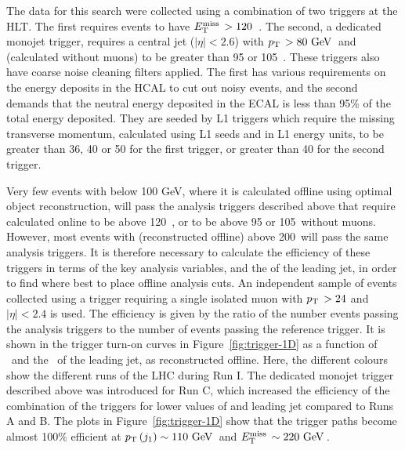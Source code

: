 The data for this search were collected using a combination of two triggers at the \ac{HLT}. 
The first requires events to have $E_{\text{T}}^{\text{miss}}\,>120$~\GeV.
The second, a dedicated monojet trigger, requires a central jet ($|\eta|<2.6$) with $p_{\text{T}}\,>80~\mathrm{GeV}\,$ and \MET 
(calculated without muons) to be greater than 95 or 105~\GeV. 
These triggers also have coarse noise cleaning filters applied. 
The first has various requirements on the energy deposits in the \ac{HCAL} to cut out noisy events, 
and the second demands that the neutral energy deposited in the \ac{ECAL} is less than 95\% of the total energy deposited.
They are seeded by \ac{L1} triggers which require the missing transverse momentum, calculated using \ac{L1} seeds and in \ac{L1} energy units, to be greater than 36, 40 or 50 for the first trigger, or greater than 40 for the second trigger. 


Very few events with \MET below 100 GeV, where it is calculated offline using optimal object reconstruction,  will pass the analysis triggers described above that require \MET calculated online to be above 120~\GeV, or to be above 95 or 105~\GeV without muons. 
However, most events with \MET (reconstructed offline) above 200~\GeV will pass the same analysis triggers. 
It is therefore necessary to calculate the efficiency of these triggers in terms of the key analysis variables, \MET and the \pt of the leading jet, in order to find where best to place offline analysis cuts. 
An independent sample of events collected using a trigger requiring a single isolated muon with $p_{\text{T}}\, > 24$ and $|\eta|<2.4$ is used.
The efficiency is given by the ratio of the number events passing the analysis triggers to the number of events passing the reference trigger. 
It is shown in the trigger turn-on curves in Figure~\ref{fig:trigger-1D} as a function of \MET\ and the \pt\ of the leading jet, as reconstructed offline. 
Here, the different colours show the different runs of the \ac{LHC} during Run I.
The dedicated monojet trigger described above was introduced for Run C, which increased the efficiency of the combination of the triggers for lower values of \MET and leading jet \pt compared to Runs A and B. 
The plots in Figure~\ref{fig:trigger-1D} show that the trigger paths become almost 100\% efficient at $p_{\text{T}}\,(j_1)\sim110~\mathrm{GeV}\,$ and $E_{\text{T}}^{\text{miss}}\,\sim220~\mathrm{GeV}\,$.

